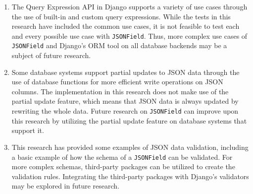 \begin{enumerate}
	\item The Query Expression API in Django supports a variety of use cases
		  through the use of built-in and custom query expressions. While the
		  tests in this research have included the common use cases, it is not
		  feasible to test each and every possible use case with
		  \verb|JSONField|. Thus, more complex use cases of \verb|JSONField|
		  and Django's ORM tool on all database backends may be a subject of
		  future research.
	\item Some database systems support partial updates to JSON data through
		  the use of database functions for more efficient write operations on
		  JSON columns. The implementation in this research does not make use
		  of the partial update feature, which means that JSON data is always
		  updated by rewriting the whole data. Future research on
		  \verb|JSONField| can improve upon this research by utilizing the
		  partial update feature on database systems that support it.
	\item This research has provided some examples of JSON data validation,
		  including a basic example of how the schema of a \verb|JSONField| can
		  be validated. For more complex schemas, third-party packages can be
		  utilized to create the validation rules. Integrating the third-party
		  packages with Django's validators may be explored in future
		  research.
\end{enumerate}
